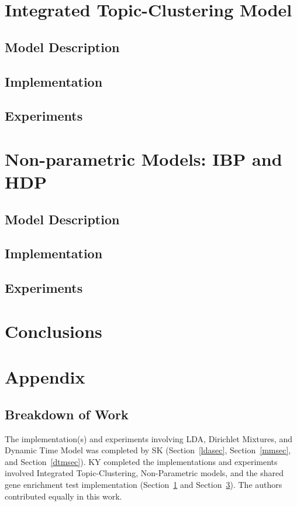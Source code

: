 \documentclass{article}
\begin{document}
\section{Integrated Topic-Clustering Model} 
\label{intsec}
\subsection{Model Description} 
\subsection{Implementation} 
\subsection{Experiments} 



\section{Non-parametric Models: IBP and HDP} 
\label{nonparametricsec}
\subsection{Model Description} 
\subsection{Implementation} 
\subsection{Experiments} 

\section{Conclusions} 
\label{nonparametricsec}






\section{Appendix} 

\subsection{Breakdown of Work}
The implementation(s) and experiments involving LDA, Dirichlet Mixtures, and Dynamic Time Model was completed by SK (Section~\ref{ldasec}, Section~\ref{mmsec}, and Section~\ref{dtmsec}). KY completed the implementations and experiments involved Integrated Topic-Clustering, Non-Parametric models, and the shared gene enrichment test implementation (Section~\ref{intsec} and Section~\ref{nonparametricsec}). The authors contributed equally in this work.
\end{document}
